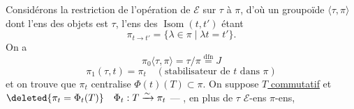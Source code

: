 
Considérons la restriction de l'opération de $\mathcal E$ sur $\tau$ à $\pi$, d'où un groupoïde $\langle\tau,\pi\rangle$ dont l'ens des objets est $\tau$, l'ens des $\operatorname{Isom}(t,t')$ étant
\[
\pi_{t\to t'}=\{\lambda\in\pi\mid\lambda t=t'\}.
\]
 On a
\[
\pi_0\langle\tau,\pi\rangle=\tau/\pi\overset{\mathrm{dfn}}=J
\]
\[
\pi_1(\tau,t)=\pi_t\quad(\text{stabilisateur de }t\text{ dans }\pi)
\]
et on trouve que $\pi_t$ centralise $\Phi(t)(T)\subset\pi$. On suppose \uline{$T$ commutatif} et $\deleted{\pi_t=\Phi_t(T)}\quad\Phi_t:T\xrightarrow{\sim}\pi_t$ --- , en plus de $\tau$ $\mathcal E$-ens  $\pi$-ens,
